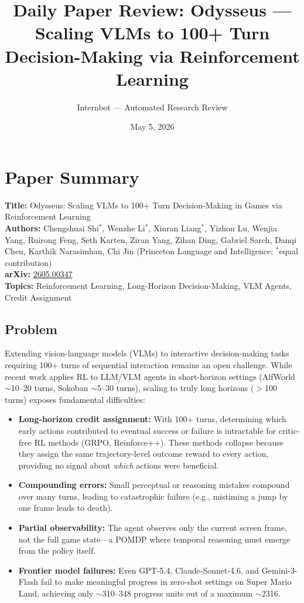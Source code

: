 \documentclass[11pt]{article}
\title{Daily Paper Review: Odysseus --- Scaling VLMs to 100+ Turn\\Decision-Making via Reinforcement Learning}
\author{Internbot --- Automated Research Review}
\date{May 5, 2026}
\begin{document}
\maketitle

\section{Paper Summary}

\textbf{Title:} Odysseus: Scaling VLMs to 100+ Turn Decision-Making in Games via Reinforcement Learning \\
\textbf{Authors:} Chengshuai Shi$^*$, Wenzhe Li$^*$, Xinran Liang$^*$, Yizhou Lu, Wenjia Yang, Ruirong Feng, Seth Karten, Ziran Yang, Zihan Ding, Gabriel Sarch, Danqi Chen, Karthik Narasimhan, Chi Jin (Princeton Language and Intelligence; $^*$equal contribution) \\
\textbf{arXiv:} \href{https://arxiv.org/abs/2605.00347}{2605.00347} \\
\textbf{Topics:} Reinforcement Learning, Long-Horizon Decision-Making, VLM Agents, Credit Assignment

\subsection{Problem}

Extending vision-language models (VLMs) to interactive decision-making tasks requiring 100+ turns of sequential interaction remains an open challenge. While recent work applies RL to LLM/VLM agents in short-horizon settings (AlfWorld $\sim$10--20 turns, Sokoban $\sim$5--30 turns), scaling to truly long horizons ($>$100 turns) exposes fundamental difficulties:

\begin{itemize}
    \item \textbf{Long-horizon credit assignment:} With 100+ turns, determining which early actions contributed to eventual success or failure is intractable for critic-free RL methods (GRPO, Reinforce++). These methods collapse because they assign the same trajectory-level outcome reward to every action, providing no signal about \emph{which} actions were beneficial.
    \item \textbf{Compounding errors:} Small perceptual or reasoning mistakes compound over many turns, leading to catastrophic failure (e.g., mistiming a jump by one frame leads to death).
    \item \textbf{Partial observability:} The agent observes only the current screen frame, not the full game state---a POMDP where temporal reasoning must emerge from the policy itself.
    \item \textbf{Frontier model failures:} Even GPT-5.4, Claude-Sonnet-4.6, and Gemini-3-Flash fail to make meaningful progress in zero-shot settings on Super Mario Land, achieving only $\sim$310--348 progress units out of a maximum $\sim$2316.
\end{itemize}
\end{document}
